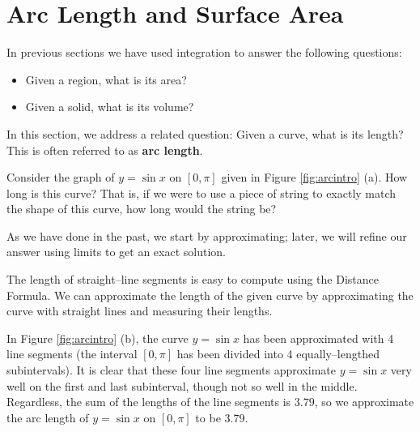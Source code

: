 \section{Arc Length and Surface Area}\label{sec:arc_length}

In previous sections we have used integration to answer the following questions:
	\begin{itemize}
	\item		Given a region, what is its area?
	\item		Given a solid, what is its volume?
	\end{itemize}
	
In this section, we address a related question: Given a curve, what is its length? This is often referred to as \textbf{arc length}. 

Consider the graph of $y=\sin x$ on $[0,\pi]$ given in Figure \ref{fig:arcintro} (a). How long is this curve? That is, if we were to use a piece of string to exactly match the shape of this curve, how long would the string be?

As we have done in the past, we start by approximating; later, we will refine our answer using limits to get an exact solution.

The length of straight--line segments is easy to compute using the Distance Formula. We can approximate the length of the given curve by approximating the curve with straight lines and measuring their lengths. 

In Figure \ref{fig:arcintro} (b), the curve $y=\sin x$ has been approximated with 4 line segments (the interval $[0,\pi]$ has been divided into 4 equally--lengthed subintervals). It is clear that these four line segments approximate $y=\sin x$ very well on the first and last subinterval, though not so well in the middle. Regardless, the sum of the lengths of the line segments is $3.79$, so we approximate the arc length of $y=\sin x$ on $[0,\pi]$ to be $3.79$. 

